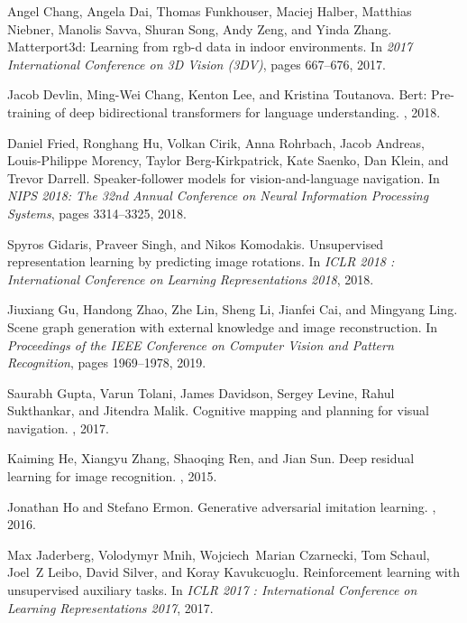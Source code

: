 \documentclass[10pt,twocolumn,letterpaper]{article}
\begin{document}
\begin{thebibliography}{10}
	Angel {Chang}, Angela {Dai}, Thomas {Funkhouser}, Maciej {Halber}, Matthias
	{Niebner}, Manolis {Savva}, Shuran {Song}, Andy {Zeng}, and Yinda {Zhang}.
	\newblock Matterport3d: Learning from rgb-d data in indoor environments.
	\newblock In {\em 2017 International Conference on 3D Vision (3DV)}, pages
	667--676, 2017.
	
	Jacob {Devlin}, Ming-Wei {Chang}, Kenton {Lee}, and Kristina {Toutanova}.
	\newblock Bert: Pre-training of deep bidirectional transformers for language
	understanding.
	, 2018.
	
	Daniel {Fried}, Ronghang {Hu}, Volkan {Cirik}, Anna {Rohrbach}, Jacob
	{Andreas}, Louis-Philippe {Morency}, Taylor {Berg-Kirkpatrick}, Kate
	{Saenko}, Dan {Klein}, and Trevor {Darrell}.
	\newblock Speaker-follower models for vision-and-language navigation.
	\newblock In {\em NIPS 2018: The 32nd Annual Conference on Neural Information
		Processing Systems}, pages 3314--3325, 2018.
	
	Spyros {Gidaris}, Praveer {Singh}, and Nikos {Komodakis}.
	\newblock Unsupervised representation learning by predicting image rotations.
	\newblock In {\em ICLR 2018 : International Conference on Learning
		Representations 2018}, 2018.
	
	Jiuxiang {Gu}, Handong {Zhao}, Zhe {Lin}, Sheng {Li}, Jianfei {Cai}, and
	Mingyang {Ling}.
	\newblock Scene graph generation with external knowledge and image
	reconstruction.
	\newblock In {\em Proceedings of the IEEE Conference on Computer Vision and
		Pattern Recognition}, pages 1969--1978, 2019.
	
	Saurabh {Gupta}, Varun {Tolani}, James {Davidson}, Sergey {Levine}, Rahul
	{Sukthankar}, and Jitendra {Malik}.
	\newblock Cognitive mapping and planning for visual navigation.
	, 2017.
	
	Kaiming {He}, Xiangyu {Zhang}, Shaoqing {Ren}, and Jian {Sun}.
	\newblock Deep residual learning for image recognition.
	, 2015.
	
	Jonathan {Ho} and Stefano {Ermon}.
	\newblock Generative adversarial imitation learning.
	, 2016.
	
	Max {Jaderberg}, Volodymyr {Mnih}, Wojciech~Marian {Czarnecki}, Tom {Schaul},
	Joel~Z {Leibo}, David {Silver}, and Koray {Kavukcuoglu}.
	\newblock Reinforcement learning with unsupervised auxiliary tasks.
	\newblock In {\em ICLR 2017 : International Conference on Learning
		Representations 2017}, 2017.
	

\end{thebibliography}
\end{document}
